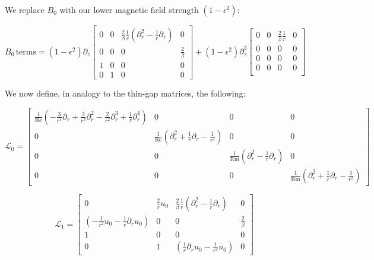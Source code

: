 \documentclass{paper}
\newcommand{\beq}{\begin{equation}}
\newcommand{\eeq}{\end{equation}}
\newcommand\reye{\mathrm{Re}}
\newcommand\reym{\mathrm{Rm}}
\begin{document}
We replace $B_0$ with our lower magnetic field strength $(1 - \epsilon^2)$:

\beq
B_0 \, \mathrm{terms} = 
(1 - \epsilon^2) \partial_z \left[\begin{matrix}
0 & 0 & \frac{2}{\beta} \frac{1}{r} \left(\partial_r^2 - \frac{1}{r}\partial_r\right) & 0 \\
0 & 0 & 0 & \frac{2}{\beta}\\
1 & 0 & 0 & 0\\
0 & 1 & 0 & 0
\end{matrix}\right] 
+
(1 - \epsilon^2) \partial_z^3 \left[\begin{matrix}
0 & 0 & \frac{2}{\beta} \frac{1}{r} & 0 \\
0 & 0 & 0 & 0 \\
0 & 0 & 0 & 0 \\
0 & 0 & 0 & 0 \\
\end{matrix}\right]
\eeq

We now define, in analogy to the thin-gap matrices, the following:

\beq
\mathcal{L}_0 = \left[\begin{matrix}
\frac{1}{\reye} \left(-\frac{3}{r^4} \partial_r + \frac{3}{r^3} \partial_r^2 - \frac{2}{r^2} \partial_r^3 + \frac{1}{r} \partial_r^4\right) & 0 & 0 & 0\\
0 & \frac{1}{\reye} \left(\partial_r^2 + \frac{1}{r} \partial_r - \frac{1}{r^2} \right) & 0 & 0 \\
0 & 0 & \frac{1}{\reym} \left(\partial_r^2 - \frac{1}{r} \partial_r\right) & 0 \\
0 & 0 & 0 & \frac{1}{\reym} \left(\partial_r^2 + \frac{1}{r}\partial_r - \frac{1}{r^2}\right)
\end{matrix}\right]
\eeq


\beq
\mathcal{L}_1 = \left[\begin{matrix}
0 & \frac{2}{r} u_0 & \frac{2}{\beta} \frac{1}{r} \left(\partial_r^2 - \frac{1}{r}\partial_r\right) & 0 \\
(-\frac{1}{r^2} u_0 - \frac{1}{r} \partial_r u_0) & 0 & 0 & \frac{2}{\beta} \\
1 & 0 & 0 & 0 \\
0 & 1 & (\frac{1}{r}\partial_r u_0 - \frac{1}{r^2} u_0) & 0
\end{matrix}\right]
\eeq
\end{document}
